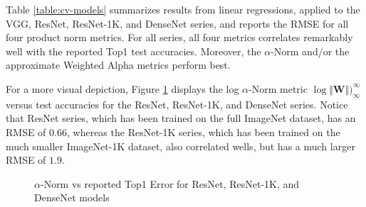 Table \ref{table:cv-models} summarizes results from linear regressions, applied to the VGG, ResNet, ResNet-1K, and DenseNet series,
and reports the RMSE for all four product norm metrics.  For all series, all four metrics correlates remarkably well with
the reported Top1 test accuracies.  Moreover, the $\alpha$-Norm and/or the approximate Weighted Alpha metrics perform best.

For a more visual depiction, Figure \ref{fig:cv2-accuracy} displays the log $\alpha$-Norm metric  $\log\Vert\mathbf{W}\Vert)_{\infty}^{\infty}$ 
versus test accuracies for the ResNet, ResNet-1K, and DenseNet series. Notice that ResNet series, which has been trained on the full
ImageNet dataset, has an RMSE of $0.66$, whereas the ResNet-1K series, which has been trained on the much smaller ImageNet-1K dataset,
also correlated wells, but has a much larger RMSE of $1.9$.


\begin{figure}[t]
    \centering

    \qquad
    \qquad
    \caption{$\alpha$-Norm vs reported Top1 Error for  ResNet, ResNet-1K, and DenseNet models}
    \label{fig:cv2-accuracy}
\end{figure}


